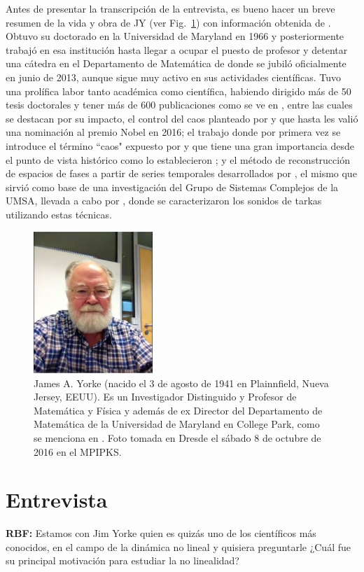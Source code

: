 \documentclass{rbf}
\newcommand{\mr}{{\bf RBF: }}
\begin{document}
Antes de presentar la transcripción de la entrevista, es bueno hacer un breve resumen de la vida y obra de JY (ver Fig.~\ref{JY}) con información obtenida de \cite{WIKI17}. Obtuvo su doctorado en la Universidad de Maryland en 1966 y posteriormente trabajó en esa institución hasta llegar a ocupar el puesto de profesor y detentar una cátedra en el Departamento de Matemática de donde se jubiló oficialmente en junio de 2013, aunque sigue muy activo en sus actividades científicas. Tuvo una prolífica labor tanto académica como científica, habiendo dirigido más de 50 tesis doctorales y tener más de 600 publicaciones como se ve en \cite{GS17}, entre las cuales se destacan por su impacto, el control del caos planteado por \cite{OTT90} y que hasta les valió una nominación al premio Nobel en 2016; el trabajo donde por primera vez se introduce el término ``caos" expuesto por \cite{LI75} y que tiene una gran importancia desde el punto de vista histórico como lo establecieron \cite{AUBIN02}; y el método de reconstrucción de espacios de fases a partir de series temporales desarrollados por \cite{SAUER91}, el mismo que sirvió como base de una investigación del Grupo de Sistemas Complejos de la UMSA, llevada a cabo por \cite{GERARD16}, donde se caracterizaron los sonidos de tarkas utilizando estas técnicas.
\begin{figure}[htbp!]
 \centering
  \includegraphics[width=0.4\textwidth]{Jim_Yorke.pdf}
 \caption{James A. Yorke (nacido el 3 de agosto de 1941 en Plainnfield, Nueva Jersey, EEUU). Es un Investigador Distinguido y Profesor de Matemática y Física y además de ex Director del Departamento de Matemática de la Universidad de Maryland en College Park, como se menciona en \cite{WIKI17}. Foto tomada en Dresde el sábado 8 de octubre de 2016 en el MPIPKS.}
 \label{JY}
\end{figure}

\section{Entrevista}\label{inter}
\mr Estamos con Jim Yorke quien es quizás uno de los científicos más conocidos, en el campo de la dinámica no lineal y quisiera preguntarle ¿Cuál fue su principal motivación para estudiar la no linealidad?
\end{document}
